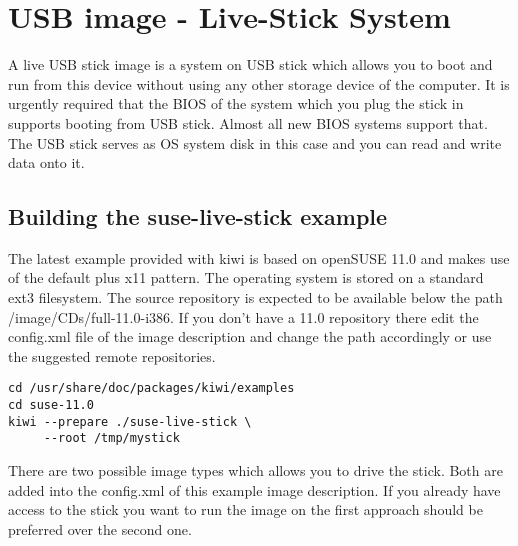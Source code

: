 \chapter{USB image - Live-Stick System}
\label{chapter:usb}
\minitoc

A live USB stick image is a system on USB stick which allows you to
boot and run from this device without using any other storage device of
the computer. It is urgently required that the BIOS of the system which
you plug the stick in supports booting from USB stick. Almost all
new BIOS systems support that. The USB stick serves as OS system disk
in this case and you can read and write data onto it.

\section{Building the suse-live-stick example}

The latest example provided with kiwi is based on openSUSE 11.0 and makes use
of the default plus x11 pattern. The operating system is stored on a
standard ext3 filesystem. The source repository is expected to be
available below the path /image/CDs/full-11.0-i386. If you don't have
a 11.0 repository there edit the config.xml file of the image description
and change the path accordingly or use the suggested remote repositories.

\begin{Command}{12cm}
\begin{verbatim}
cd /usr/share/doc/packages/kiwi/examples
cd suse-11.0
kiwi --prepare ./suse-live-stick \
     --root /tmp/mystick
\end{verbatim}
\end{Command}

There are two possible image types which allows you to drive the
stick. Both are added into the config.xml of this example image
description. If you already have access to the stick you want to
run the image on the first approach should be preferred over the
second one.

